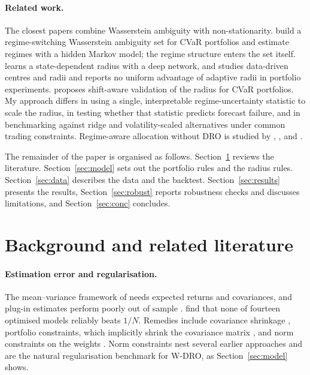 \documentclass[11pt]{article}
\begin{document}
\paragraph{Related work.} The closest papers combine Wasserstein ambiguity with non-stationarity. \citet{pun2023} build a regime-switching Wasserstein ambiguity set for CVaR portfolios and estimate regimes with a hidden Markov model; the regime structure enters the set itself. \citet{guo2026a} learns a state-dependent radius with a deep network, and \citet{guo2026b} studies data-driven centres and radii and reports no uniform advantage of adaptive radii in portfolio experiments. \citet{long2025} proposes shift-aware validation of the radius for CVaR portfolios. My approach differs in using a single, interpretable regime-uncertainty statistic to scale the radius, in testing whether that statistic predicts forecast failure, and in benchmarking against ridge and volatility-scaled alternatives under common trading constraints. Regime-aware allocation without DRO is studied by \citet{ang2002}, \citet{guidolin2007}, \citet{kritzman2012} and \citet{boukardagha2026}.

The remainder of the paper is organised as follows. Section~\ref{sec:lit} reviews the literature. Section~\ref{sec:model} sets out the portfolio rules and the radius rules. Section~\ref{sec:data} describes the data and the backtest. Section~\ref{sec:results} presents the results, Section~\ref{sec:robust} reports robustness checks and discusses limitations, and Section~\ref{sec:conc} concludes.

\section{Background and related literature}\label{sec:lit}

\paragraph{Estimation error and regularisation.} The mean--variance framework of \citet{markowitz1952} needs expected returns and covariances, and plug-in estimates perform poorly out of sample \citep{michaud1989}. \citet{demiguel2009rfs} find that none of fourteen optimised models reliably beats $1/N$. Remedies include covariance shrinkage \citep{ledoit2004}, portfolio constraints, which implicitly shrink the covariance matrix \citep{jagannathan2003}, and norm constraints on the weights \citep{demiguel2009ms}. Norm constraints nest several earlier approaches and are the natural regularisation benchmark for W-DRO, as Section~\ref{sec:model} shows.
\end{document}
